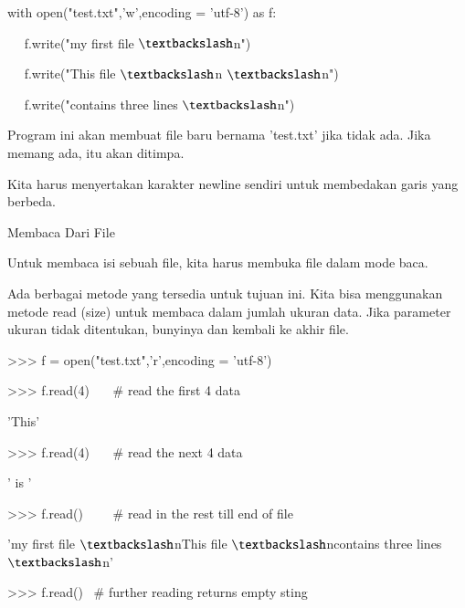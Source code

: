 \documentclass[a4paper,12pt]{report}
\begin{document}
\vspace{12pt}
\noindent 
with open("test.txt",'w',encoding = 'utf-8') as f: \par
\noindent 
~~ f.write("my first file $  \textbackslash  $n") \par
\noindent 
~~ f.write("This file $  \textbackslash  $n $  \textbackslash  $n") \par
\noindent 
~~ f.write("contains three lines $  \textbackslash  $n") \par
\vspace{12pt}
\noindent 
Program ini akan membuat file baru bernama 'test.txt' jika tidak ada. Jika memang ada, itu akan ditimpa. \par
\vspace{12pt}
\noindent 
Kita harus menyertakan karakter newline sendiri untuk membedakan garis yang berbeda. \par
\noindent 
Membaca Dari File \par
\vspace{12pt}
\noindent 
Untuk membaca isi sebuah file, kita harus membuka file dalam mode baca. \par
\vspace{12pt}
\noindent 
Ada berbagai metode yang tersedia untuk tujuan ini. Kita bisa menggunakan metode read (size) untuk membaca dalam jumlah ukuran data. Jika parameter ukuran tidak ditentukan, bunyinya dan kembali ke akhir file. \par
\vspace{12pt}
\vspace{12pt}
\noindent 
>>> f = open("test.txt",'r',encoding = 'utf-8') \par
\noindent 
>>> f.read(4)~~~  $  \#  $ read the first 4 data \par
\noindent 
'This' \par
\vspace{12pt}
\noindent 
>>> f.read(4)~~~  $  \#  $ read the next 4 data \par
\noindent 
' is ' \par
\vspace{12pt}
\noindent 
>>> f.read()~~~~  $  \#  $ read in the rest till end of file \par
\noindent 
'my first file $  \textbackslash  $nThis file $  \textbackslash  $ncontains three lines $  \textbackslash  $n' \par
\vspace{12pt}
\noindent 
>>> f.read()~  $  \#  $ further reading returns empty sting \par
\vspace{12pt}
\end{document}
